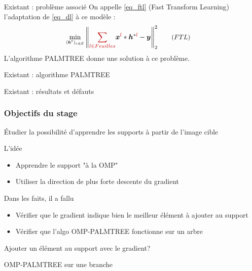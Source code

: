 \begin{frame}{Existant : problème associé}
On appelle \eqref{eq_ftl} (\alert{Fast Transform Learning}) l'adaptation de \eqref{eq_dl} à ce modèle :
\begin{equation*} {\small
\underset{\substack{(\h^\text{e})_{e \in \E}}}\min
	\norm{\Req{\sum_{l \in Feuilles}} \x^{\Req{l}} * \h^{*\Req{l}} -\y}{2}^2 \tag{${FTL}$} \label{eq_ftl}
    }
\end{equation*}
L'algorithme \alert{PALMTREE} donne une solution à ce problème.
\end{frame}


\begin{frame}{Existant : algorithme PALMTREE}
\end{frame}


\begin{frame}{Existant : résultats et défauts}
\end{frame}

\begin{frame}
	\frametitle{Objectifs du stage}
	Étudier la possibilité d'apprendre les supports à partir de l'image cible
\end{frame}



\begin{frame}{L'idée}
\begin{itemize}
	\item Apprendre le support "à la OMP"
	\item Utiliser la direction de plus forte descente du gradient
\end{itemize}
Dans les faits, il a fallu
\begin{itemize}
	\item Vérifier que le gradient indique bien le meilleur élément à ajouter au support
	\item Vérifier que l'algo OMP-PALMTREE fonctionne sur un arbre
\end{itemize}
\end{frame}


\begin{frame}{Ajouter un élément au support avec le gradient?}
\end{frame}


\begin{frame}{OMP-PALMTREE sur une branche}
\end{frame}


